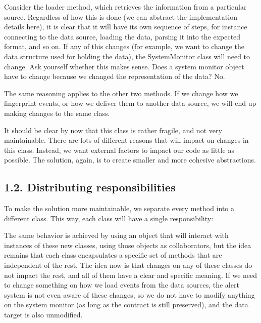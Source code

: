 \documentclass[a4paper,10pt,english]{sphinxmanual}
\begin{document}
Consider the loader method, which retrieves the information from a particular source.
Regardless of how this is done (we can abstract the implementation details here), it is clear
that it will have its own sequence of steps, for instance connecting to the data source,
loading the data, parsing it into the expected format, and so on. If any of this changes (for
example, we want to change the data structure used for holding the data), the
SystemMonitor class will need to change. Ask yourself whether this makes sense. Does a
system monitor object have to change because we changed the representation of the data?
No.

The same reasoning applies to the other two methods. If we change how we fingerprint
events, or how we deliver them to another data source, we will end up making changes to
the same class.

It should be clear by now that this class is rather fragile, and not very maintainable. There
are lots of different reasons that will impact on changes in this class. Instead, we want
external factors to impact our code as little as possible. The solution, again, is to create
smaller and more cohesive abstractions.


\subsection{1.2. Distributing responsibilities}
\label{\detokenize{chapters/4_solid_principles/index:distributing-responsibilities}}
To make the solution more maintainable, we separate every method into a different class.
This way, each class will have a single responsibility:

\begin{figure}[H]
\centering

\noindent{}
\end{figure}

The same behavior is achieved by using an object that will interact with instances of these
new classes, using those objects as collaborators, but the idea remains that each class
encapsulates a specific set of methods that are independent of the rest. The idea now is that
changes on any of these classes do not impact the rest, and all of them have a clear and
specific meaning. If we need to change something on how we load events from the data
sources, the alert system is not even aware of these changes, so we do not have to modify
anything on the system monitor (as long as the contract is still preserved), and the data
target is also unmodified.
\end{document}

